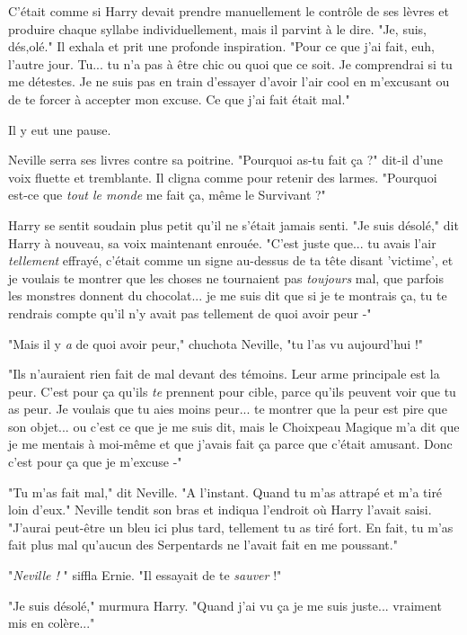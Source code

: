 C'était comme si Harry devait prendre manuellement le contrôle de ses lèvres et produire chaque syllabe individuellement, mais il parvint à le dire. "Je, suis, dés,olé." Il exhala et prit une profonde inspiration. "Pour ce que j'ai fait, euh, l'autre jour. Tu... tu n'a pas à être chic ou quoi que ce soit. Je comprendrai si tu me détestes. Je ne suis pas en train d'essayer d'avoir l'air cool en m'excusant ou de te forcer à accepter mon excuse. Ce que j'ai fait était mal."

Il y eut une pause.

Neville serra ses livres contre sa poitrine. "Pourquoi as-tu fait ça ?" dit-il d'une voix fluette et tremblante. Il cligna comme pour retenir des larmes. "Pourquoi est-ce que \emph{tout le monde}  me fait ça, même le Survivant ?"

Harry se sentit soudain plus petit qu'il ne s'était jamais senti. "Je suis désolé," dit Harry à nouveau, sa voix maintenant enrouée. "C'est juste que... tu avais l'air \emph{tellement}  effrayé, c'était comme un signe au-dessus de ta tête disant 'victime', et je voulais te montrer que les choses ne tournaient pas \emph{toujours}  mal, que parfois les monstres donnent du chocolat... je me suis dit que si je te montrais ça, tu te rendrais compte qu'il n'y avait pas tellement de quoi avoir peur -"

"Mais il y \emph{a}  de quoi avoir peur," chuchota Neville, "tu l'as vu aujourd'hui !"

"Ils n'auraient rien fait de mal devant des témoins. Leur arme principale est la peur. C'est pour ça qu'ils \emph{te}  prennent pour cible, parce qu'ils peuvent voir que tu as peur. Je voulais que tu aies moins peur... te montrer que la peur est pire que son objet... ou c'est ce que je me suis dit, mais le Choixpeau Magique m'a dit que je me mentais à moi-même et que j'avais fait ça parce que c'était amusant. Donc c'est pour ça que je m'excuse -"

"Tu m'as fait mal," dit Neville. "A l'instant. Quand tu m'as attrapé et m'a tiré loin d'eux." Neville tendit son bras et indiqua l'endroit où Harry l'avait saisi. "J'aurai peut-être un bleu ici plus tard, tellement tu as tiré fort. En fait, tu m'as fait plus mal qu'aucun des Serpentards ne l'avait fait en me poussant."

"\emph{Neville !} " siffla Ernie. "Il essayait de te \emph{sauver } !"

"Je suis désolé," murmura Harry. "Quand j'ai vu ça je me suis juste... vraiment mis en colère..."

